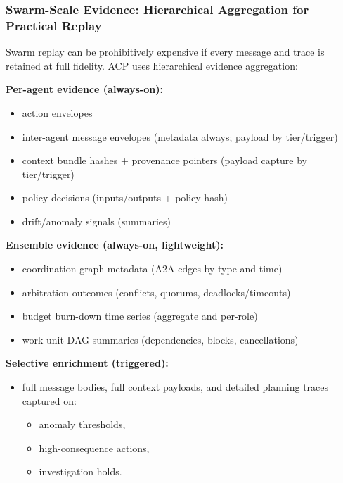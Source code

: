 \documentclass[11pt]{article}
\begin{document}
\hypertarget{swarm-scale-evidence-hierarchical-aggregation-for-practical-replay}{%
\subsubsection{Swarm-Scale Evidence: Hierarchical Aggregation for Practical Replay}\label{swarm-scale-evidence-hierarchical-aggregation-for-practical-replay}}

Swarm replay can be prohibitively expensive if every message and trace
is retained at full fidelity. ACP uses hierarchical evidence
aggregation:

\textbf{Per-agent evidence (always-on):}

\begin{itemize}
\tightlist
\item
  action envelopes
\item
  inter-agent message envelopes (metadata always; payload by
  tier/trigger)
\item
  context bundle hashes + provenance pointers (payload capture by
  tier/trigger)
\item
  policy decisions (inputs/outputs + policy hash)
\item
  drift/anomaly signals (summaries)
\end{itemize}

\textbf{Ensemble evidence (always-on, lightweight):}

\begin{itemize}
\tightlist
\item
  coordination graph metadata (A2A edges by type and time)
\item
  arbitration outcomes (conflicts, quorums, deadlocks/timeouts)
\item
  budget burn-down time series (aggregate and per-role)
\item
  work-unit DAG summaries (dependencies, blocks, cancellations)
\end{itemize}

\textbf{Selective enrichment (triggered):}

\begin{itemize}
\tightlist
\item
  full message bodies, full context payloads, and detailed planning
  traces captured on:

  \begin{itemize}
  \tightlist
  \item
    anomaly thresholds,
  \item
    high-consequence actions,
  \item
    investigation holds.
  \end{itemize}
\end{itemize}
\end{document}
